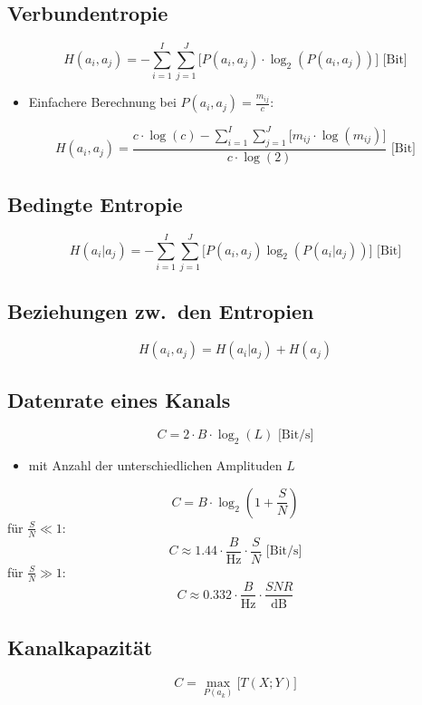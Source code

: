 
\subsection*{Verbundentropie}
\[
    H(a_i, a_j) = -\sum_{i=1}^{I} \sum_{j=1}^{J} \bigg[ P(a_i, a_j) \cdot
    \log_2( P(a_i, a_j) ) \bigg] \mbox{ [Bit]}
\]
\begin{itemize}
    \setlength{\parskip}{0pt}
    \setlength{\itemsep}{0pt plus 1pt}
    \item Einfachere Berechnung bei $P(a_i, a_j) = \frac{m_{ij}}{c}$:
\end{itemize}
\[
    H(a_i, a_j) = \frac{c \cdot \log(c) - \sum\limits_{i=1}^{I} \sum\limits_{j=1}^{J} \bigg[
    m_{ij} \cdot \log( m_{ij} ) \bigg]}{c \cdot \log(2)} \mbox{ [Bit]}
\]

\subsection*{Bedingte Entropie}
\[
    H(a_i | a_j) = - \sum_{i=1}^{I} \sum_{j=1}^{J} \bigg[ P(a_i, a_j)
    \log_2(P(a_i | a_j)) \bigg] \mbox{ [Bit]}
\]

\subsection*{Beziehungen zw.\ den Entropien}
\[
    H(a_i, a_j) = H(a_i | a_j) + H(a_j)
\]

\subsection*{Datenrate eines Kanals}
\[
    C = 2 \cdot B \cdot \log_2(L) \mbox{ [Bit/s]}
\]
\begin{itemize}
    \setlength{\parskip}{0pt}
    \setlength{\itemsep}{0pt plus 1pt}
    \item mit Anzahl der unterschiedlichen Amplituden $ L $
\end{itemize}
\[
    C = B \cdot \log_2 \left( 1 + \frac{S}{N} \right) 
\]
für $ \frac{S}{N} \ll 1 $:
\[
    C \approx 1.44 \cdot \frac{B}{\text{Hz}} \cdot \frac{S}{N} \mbox{ [Bit/s]}
\]
für $ \frac{S}{N} \gg 1 $:
\[
    C \approx 0.332 \cdot \frac{B}{\text{Hz}} \cdot \frac{SNR}{\text{dB}}
\]

\subsection*{Kanalkapazität}
\[
    C = \max_{P(a_k)} \bigg[ T(X; Y) \bigg]
\]

